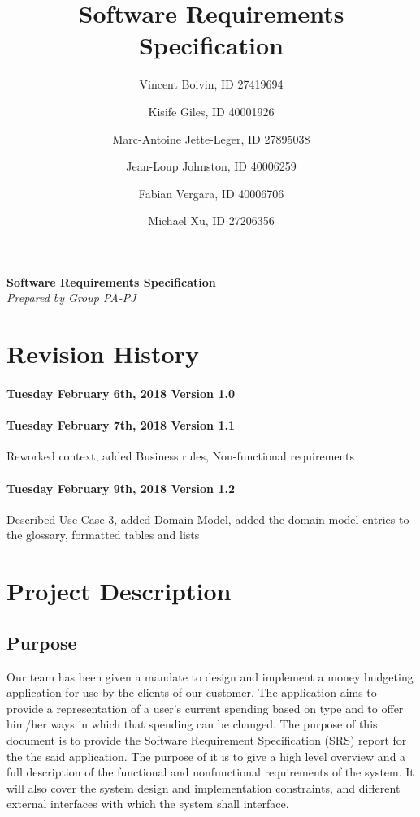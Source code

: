\documentclass[letterpaper]{article}
\title{Software Requirements Specification}
\author{
	Vincent Boivin, ID 27419694 \and
	Kisife Giles, ID 40001926 \and
	Marc-Antoine Jette-Leger, ID 27895038 \and
	Jean-Loup Johnston, ID 40006259 \and
	Fabian Vergara, ID 40006706 \and
	Michael Xu, ID 27206356
}
\begin{document}
	
\maketitle

   \begin{center}
      \Large\textbf{Software Requirements Specification}\\
      \large\textit{Prepared by Group PA-PJ}\\
   \end{center}
   
   

\newpage

\tableofcontents

\newpage

\section{Revision History}

	\paragraph{Tuesday February 6th, 2018 Version 1.0}  
	
	\paragraph{Tuesday February 7th, 2018 Version 1.1}  
	Reworked context, added Business rules, Non-functional requirements
	
	\paragraph{Tuesday February 9th, 2018 Version 1.2}  
	Described Use Case 3, added Domain Model, added the domain model entries to the glossary, formatted tables and lists
	
\newpage

\newpage

\section{Project Description}

    \subsection{Purpose}
		Our team has been given a mandate to design and implement a money budgeting application for use by the clients of our customer. The application aims to provide a representation of a user's current spending based on type and to offer him/her ways in which that spending can be changed. The purpose of this document is to provide the Software Requirement Specification (SRS) report for the the said application. The purpose of it is to give a high level overview and a full description of the functional and nonfunctional requirements of the system. It will also cover the system design and implementation constraints, and different external interfaces with which the system shall interface.
		
\end{document}
